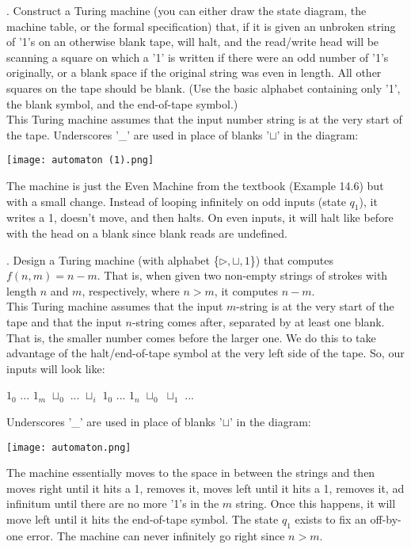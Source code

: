 \documentclass[11pt]{article}
\begin{document}
. Construct a Turing machine (you can either draw the state diagram, the machine table, or the formal specification) that, if it is given an unbroken string of '1's on an otherwise blank tape, will halt, and the read/write head will be scanning a square on which a '1' is written if there were an odd number of '1's originally, or a blank space if the original string was even in length. All other squares on the tape should be blank. (Use the basic alphabet containing only '1', the blank symbol, and the end-of-tape symbol.) \\

\color{RoyalBlue}
\noindent
This Turing machine assumes that the input number string is at the very start of the tape. Underscores '\_' are used in place of blanks '$\sqcup$' in the diagram: \\
\begin{center}\texttt{[image: automaton (1).png]}\end{center}
The machine is just the Even Machine from the textbook (Example 14.6) but with a small change. Instead of looping infinitely on odd inputs (state $q_1$), it writes a 1, doesn't move, and then halts. On even inputs, it will halt like before with the head on a blank since blank reads are undefined.
\color{black}



\newpage



. Design a Turing machine (with alphabet \{$\rhd, \sqcup, 1$\}) that computes $f(n, m)  = n-m$. That is, when given two non-empty strings of strokes with length $n$ and $m$, respectively, where $n>m$, it computes $n-m$. \\

\color{RoyalBlue}
\noindent
This Turing machine assumes that the input $m$-string is at the very start of the tape and that the input $n$-string comes after, separated by at least one blank. That is, the smaller number comes before the larger one. We do this to take advantage of the halt/end-of-tape symbol at the very left side of the tape. So, our inputs will look like:
\begin{center}
    $1_0$ ... $1_m$ $\sqcup_0$ ... $\sqcup_i$ $1_0$ ... $1_n$ $\sqcup_0$ $\sqcup_1$ ...
\end{center}
Underscores '\_' are used in place of blanks '$\sqcup$' in the diagram: \\
\begin{center}\texttt{[image: automaton.png]}\end{center}
The machine essentially moves to the space in between the strings and then moves right until it hits a 1, removes it, moves left until it hits a 1, removes it, ad infinitum until there are no more '1's in the $m$ string. Once this happens, it will move left until it hits the end-of-tape symbol. The state $q_1$ exists to fix an off-by-one error. The machine can never infinitely go right since $n>m$.
\color{black}
\end{document}
